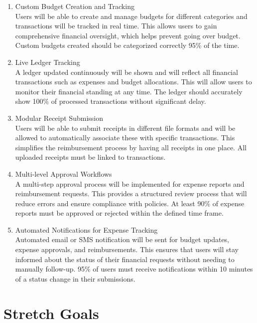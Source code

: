 \documentclass{article}
\begin{document}
\begin{enumerate}
    \item Custom Budget Creation and Tracking \\
    Users will be able to create and manage budgets for different categories and transactions will be tracked in real time. This allows users to gain comprehensive financial oversight, which helps prevent going over budget. Custom budgets created should be categorized correctly 95\% of the time.
    \item Live Ledger Tracking \\
    A ledger updated continuously will be shown and will reflect all financial transactions such as expenses and budget allocations. This will allow users to monitor their financial standing at any time. The ledger should accurately show 100\% of processed transactions without significant delay.
    \item Modular Receipt Submission \\
    Users will be able to submit receipts in different file formats and will be allowed to automatically associate these with specific transactions. This simplifies the reimbursement process by having all receipts in one place. All uploaded receipts must be linked to transactions.
    \item Multi-level Approval Workflows \\
    A multi-step approval process will be implemented for expense reports and reimbursement requests. This provides a structured review process that will reduce errors and ensure compliance with policies. At least 90\% of expense reports must be approved or rejected within the defined time frame.
    \item Automated Notifications for Expense Tracking \\
    Automated email or SMS notification will be sent for budget updates, expense approvals, and reimbursements. This ensures that users will stay informed about the status of their financial requests without needing to manually follow-up. 95\% of users must receive notifications within 10 minutes of a status change in their submissions.
\end{enumerate}

\section{Stretch Goals}
\end{document}
